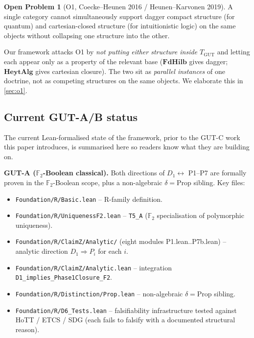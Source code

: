 \documentclass[11pt,a4paper]{article}
\theoremstyle{plain}
\theoremstyle{definition}
\newtheorem{openproblem}[theorem]{Open Problem}
\theoremstyle{remark}
\newcommand{\F}{\mathbb{F}}
\newcommand{\cat}[1]{\mathbf{#1}}
\newcommand{\HeytAlg}{\cat{HeytAlg}}
\newcommand{\FdHilb}{\cat{FdHilb}}
\newcommand{\TGUT}{T_{\mathrm{GUT}}}
\begin{document}
\begin{openproblem}[O1, Coecke--Heunen 2016 / Heunen--Karvonen 2019]\label{op:O1}
A single category cannot simultaneously support dagger compact structure (for quantum) and cartesian-closed structure (for intuitionistic logic) on the same objects without collapsing one structure into the other.
\end{openproblem}

Our framework attacks O1 by \emph{not putting either structure inside $\TGUT$} and letting each appear only as a property of the relevant base ($\FdHilb$ gives dagger; $\HeytAlg$ gives cartesian closure). The two sit as \emph{parallel instances} of one doctrine, not as competing structures on the same objects. We elaborate this in \cref{sec:o1}.

\subsection{Current GUT-A/B status}\label{sec:background:gutab}

The current Lean-formalised state of the framework, prior to the GUT-C work this paper introduces, is summarised here so readers know what they are building on.

\textbf{GUT-A ($\F_2$-Boolean classical).} Both directions of $D_1 \longleftrightarrow$ P1--P7 are formally proven in the $\F_2$-Boolean scope, plus a non-algebraic $\delta = \mathrm{Prop}$ sibling. Key files:

\begin{itemize}[leftmargin=*]
\item \texttt{Foundation/R/Basic.lean} -- R-family definition.
\item \texttt{Foundation/R/UniquenessF2.lean} -- \texttt{T5\_A} ($\F_2$ specialisation of polymorphic uniqueness).
\item \texttt{Foundation/R/ClaimZ/Analytic/} (eight modules P1.lean..P7b.lean) -- analytic direction $D_1 \Longrightarrow P_i$ for each $i$.
\item \texttt{Foundation/R/ClaimZ/Analytic.lean} -- integration \texttt{D1\_implies\_Phase1Closure\_F2}.
\item \texttt{Foundation/R/Distinction/Prop.lean} -- non-algebraic $\delta = \mathrm{Prop}$ sibling.
\item \texttt{Foundation/R/D6\_Tests.lean} -- falsifiability infrastructure tested against HoTT / ETCS / SDG (each fails to falsify with a documented structural reason).
\end{itemize}
\end{document}
